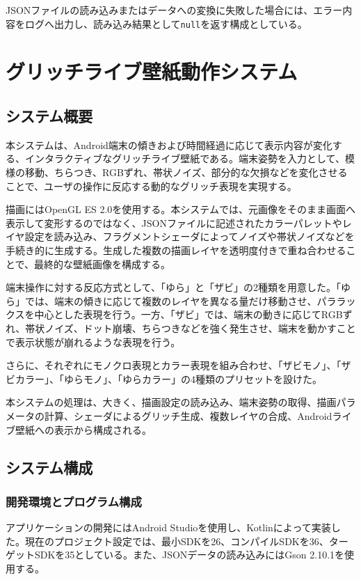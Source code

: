 JSONファイルの読み込みまたはデータへの変換に失敗した場合には、エラー内容をログへ出力し、読み込み結果として\texttt{null}を返す構成としている。
\chapter{グリッチライブ壁紙動作システム}

\section{システム概要}

本システムは、Android端末の傾きおよび時間経過に応じて表示内容が変化する、インタラクティブなグリッチライブ壁紙である。端末姿勢を入力として、模様の移動、ちらつき、RGBずれ、帯状ノイズ、部分的な欠損などを変化させることで、ユーザの操作に反応する動的なグリッチ表現を実現する。

描画にはOpenGL ES 2.0を使用する。本システムでは、元画像をそのまま画面へ表示して変形するのではなく、JSONファイルに記述されたカラーパレットやレイヤ設定を読み込み、フラグメントシェーダによってノイズや帯状ノイズなどを手続き的に生成する。生成した複数の描画レイヤを透明度付きで重ね合わせることで、最終的な壁紙画像を構成する。

端末操作に対する反応方式として、「ゆら」と「ザビ」の2種類を用意した。「ゆら」では、端末の傾きに応じて複数のレイヤを異なる量だけ移動させ、パララックスを中心とした表現を行う。一方、「ザビ」では、端末の動きに応じてRGBずれ、帯状ノイズ、ドット崩壊、ちらつきなどを強く発生させ、端末を動かすことで表示状態が崩れるような表現を行う。

さらに、それぞれにモノクロ表現とカラー表現を組み合わせ、「ザビモノ」、「ザビカラー」、「ゆらモノ」、「ゆらカラー」の4種類のプリセットを設けた。

本システムの処理は、大きく、描画設定の読み込み、端末姿勢の取得、描画パラメータの計算、シェーダによるグリッチ生成、複数レイヤの合成、Androidライブ壁紙への表示から構成される。


\section{システム構成}

\subsection{開発環境とプログラム構成}

アプリケーションの開発にはAndroid Studioを使用し、Kotlinによって実装した。現在のプロジェクト設定では、最小SDKを26、コンパイルSDKを36、ターゲットSDKを35としている。また、JSONデータの読み込みにはGson 2.10.1を使用する。

